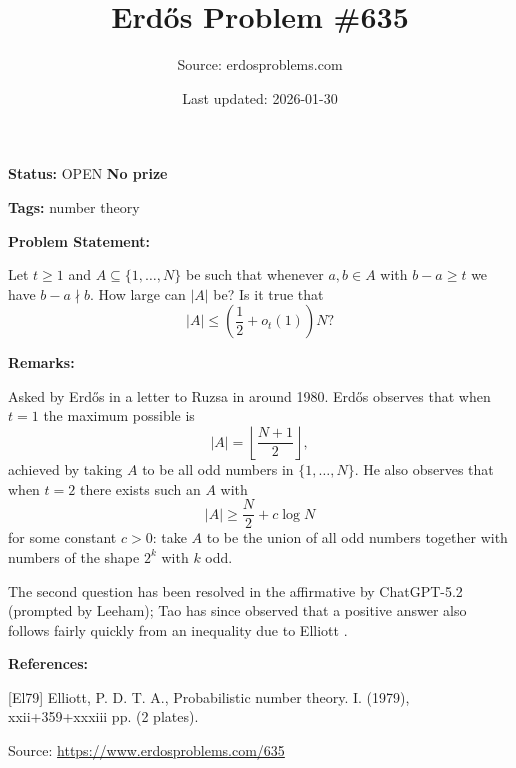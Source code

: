 \documentclass{article}
\title{Erd\H{o}s Problem \#635}
\date{Last updated: 2026-01-30}
\author{Source: erdosproblems.com}
\begin{document}
\maketitle

\noindent\textbf{Status:} OPEN \quad \textbf{No prize}

\noindent\textbf{Tags:} number theory

\medskip
\noindent\textbf{Problem Statement:}

Let $t\geq 1$ and $A\subseteq \{1,\ldots,N\}$ be such that whenever $a,b\in A$ with $b-a\geq t$ we have $b-a\nmid b$. How large can $\lvert A\rvert$ be? Is it true that\[\lvert A\rvert \leq \left(\frac{1}{2}+o_t(1)\right)N?\]

\bigskip
\noindent\textbf{Remarks:}

Asked by Erd\H{o}s in a letter to Ruzsa in around 1980. Erd\H{o}s observes that when $t=1$ the maximum possible is\[\lvert A\rvert=\left\lfloor\frac{N+1}{2}\right\rfloor,\]achieved by taking $A$ to be all odd numbers in $\{1,\ldots,N\}$. He also observes that when $t=2$ there exists such an $A$ with\[\lvert A\rvert \geq \frac{N}{2}+c\log N\]for some constant $c>0$: take $A$ to be the union of all odd numbers together with numbers of the shape $2^k$ with $k$ odd.

The second question has been resolved in the affirmative by ChatGPT-5.2 (prompted by Leeham); Tao has since observed that a positive answer also follows fairly quickly from an inequality due to Elliott \cite{El79}.

\bigskip
\noindent\textbf{References:}

[El79] Elliott, P. D. T. A., Probabilistic number theory. I. (1979), xxii+359+xxxiii pp. (2 plates).

\bigskip
\noindent\small{Source: \url{https://www.erdosproblems.com/635}}
\end{document}
